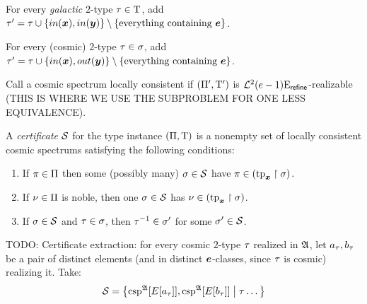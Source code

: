 For every \emph{galactic} $2$-type $\tau \in \mathrm{T}$, add
$\tau' = \tau \cup \left\{in(\bm{x}), in(\bm{y})\right\} \setminus 
\left\{\text{everything containing }\bm{e}\right\}$.

For every (cosmic) $2$-type $\tau \in \sigma$, add
$\tau' = \tau \cup \left\{in(\bm{x}),out(\bm{y})\right\} \setminus \left\{\text{everything
containing }\bm{e}\right\}$.

Call a cosmic spectrum locally consistent if $(\Pi', \mathrm{T}')$ is
$\mathcal{L}^{2}_{{}}{(e-1)}\mathrm{E}_{\mathsf{refine}}$-realizable (THIS IS WHERE WE USE THE
SUBPROBLEM FOR ONE LESS EQUIVALENCE).

\begin{definition}
A \emph{certificate} $\mathcal{S}$ for the type instance $(\Pi,\mathrm{T})$ is a
nonempty set of locally consistent cosmic spectrums satisfying the following
conditions:
\begin{enumerate}
  \item If $\pi \in \Pi$ then some (possibly many) $\sigma \in \mathcal{S}$ have
  $\pi \in (\operatorname{tp}_{\bm{x}}\restriction \sigma)$.
  \item If $\nu \in \Pi$ is noble, then one $\sigma \in \mathcal{S}$ has 
  $\nu \in (\operatorname{tp}_{\bm{x}}\restriction \sigma)$.
  \item If $\sigma \in \mathcal{S}$ and $\tau \in \sigma$,
  then $\tau^{-1} \in \sigma'$ for some $\sigma' \in \mathcal{S}$.
\end{enumerate}
\end{definition}

TODO: Certificate extraction: for every cosmic $2$-type $\tau$ realized in
$\mathfrak{A}$, let $a_\tau, b_\tau$ be a pair of distinct elements (and in
distinct $\bm{e}$-classes, since $\tau$ is cosmic) realizing it. Take:
\[
  \mathcal{S} = \left\{\operatorname{csp}^{\mathfrak{A}}[E[a_\tau]], \operatorname{csp}^{\mathfrak{A}}[E[b_\tau]]\mathrel{}\middle|\mathrel{}\tau
  \dots\right\}
\]